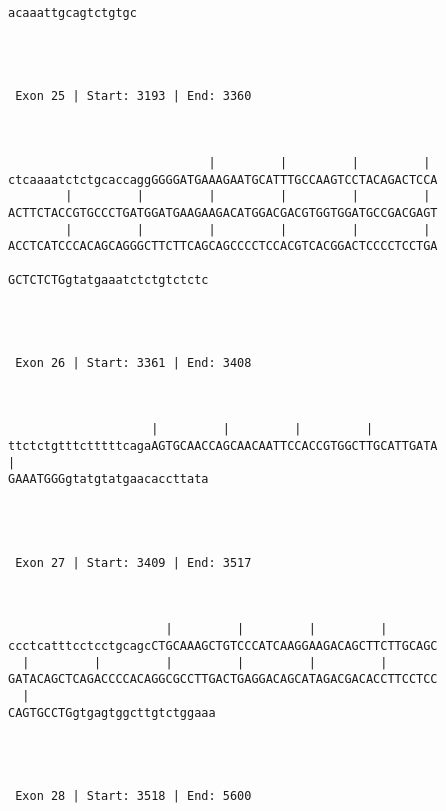 \documentclass{article}
\begin{document}
\begin{Verbatim}
acaaattgcagtctgtgc




 Exon 25 | Start: 3193 | End: 3360 



                            |         |         |         | 
ctcaaaatctctgcaccaggGGGGATGAAAGAATGCATTTGCCAAGTCCTACAGACTCCA
        |         |         |         |         |         | 
ACTTCTACCGTGCCCTGATGGATGAAGAAGACATGGACGACGTGGTGGATGCCGACGAGT
        |         |         |         |         |         | 
ACCTCATCCCACAGCAGGGCTTCTTCAGCAGCCCCTCCACGTCACGGACTCCCCTCCTGA
                            
GCTCTCTGgtatgaaatctctgtctctc




 Exon 26 | Start: 3361 | End: 3408 



                    |         |         |         |         
ttctctgtttctttttcagaAGTGCAACCAGCAACAATTCCACCGTGGCTTGCATTGATA
|                           
GAAATGGGgtatgtatgaacaccttata




 Exon 27 | Start: 3409 | End: 3517 



                      |         |         |         |       
ccctcatttcctcctgcagcCTGCAAAGCTGTCCCATCAAGGAAGACAGCTTCTTGCAGC
  |         |         |         |         |         |       
GATACAGCTCAGACCCCACAGGCGCCTTGACTGAGGACAGCATAGACGACACCTTCCTCC
  |                          
CAGTGCCTGgtgagtggcttgtctggaaa




 Exon 28 | Start: 3518 | End: 5600 




\end{Verbatim}
\end{document}
